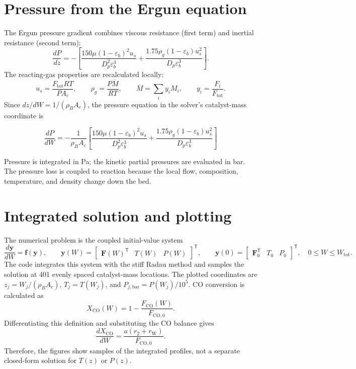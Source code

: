 \documentclass[10pt,a4paper]{article}
\begin{document}
\section{Pressure from the Ergun equation}
The Ergun pressure gradient combines viscous resistance (first term) and inertial resistance (second term):
\[
\frac{dP}{dz}=-\left[
\frac{150\mu(1-\varepsilon_b)^2u_s}{D_p^2\varepsilon_b^3}
+\frac{1.75\rho_g(1-\varepsilon_b)u_s^2}{D_p\varepsilon_b^3}
\right].
\]
The reacting-gas properties are recalculated locally:
\[
u_s=\frac{F_{\mathrm{tot}}RT}{PA_c},\qquad
\rho_g=\frac{P\overline M}{RT},\qquad
\overline M=\sum_i y_iM_i,\qquad y_i=\frac{F_i}{F_{\mathrm{tot}}}.
\]
Since \(dz/dW=1/(\rho_BA_c)\), the pressure equation in the solver's catalyst-mass coordinate is
\begin{keyequation}
\[
\boxed{\displaystyle
\frac{dP}{dW}=-\frac{1}{\rho_BA_c}\left[
\frac{150\mu(1-\varepsilon_b)^2u_s}{D_p^2\varepsilon_b^3}
+\frac{1.75\rho_g(1-\varepsilon_b)u_s^2}{D_p\varepsilon_b^3}
\right]}
\]
\end{keyequation}
Pressure is integrated in Pa; the kinetic partial pressures are evaluated in bar. The pressure loss is coupled to reaction because the local flow, composition, temperature, and density change down the bed.

\section{Integrated solution and plotting}
The numerical problem is the coupled initial-value system
\[
\frac{d\mathbf y}{dW}=\mathbf f(\mathbf y),\qquad
\mathbf y(W)=
\begin{bmatrix}\mathbf F(W)^{\mathsf T}&T(W)&P(W)\end{bmatrix}^{\mathsf T},\qquad
\mathbf y(0)=
\begin{bmatrix}\mathbf F_0^{\mathsf T}&T_0&P_0\end{bmatrix}^{\mathsf T},
\quad 0\le W\le W_{\mathrm{tot}}.
\]
The code integrates this system with the stiff Radau method and samples the solution at 401 evenly spaced catalyst-mass locations. The plotted coordinates are \(z_j=W_j/(\rho_BA_c)\), \(T_j=T(W_j)\), and \(P_{j,\mathrm{bar}}=P(W_j)/10^5\). CO conversion is calculated as
\[
X_{\mathrm{CO}}(W)=1-\frac{F_{\mathrm{CO}}(W)}{F_{\mathrm{CO},0}}.
\]
Differentiating this definition and substituting the CO balance gives
\[
\frac{dX_{\mathrm{CO}}}{dW}
=\frac{a(r_2+r_{\mathrm W})}{F_{\mathrm{CO},0}}.
\]
Therefore, the figures show samples of the integrated profiles, not a separate closed-form solution for \(T(z)\) or \(P(z)\).
\end{document}
